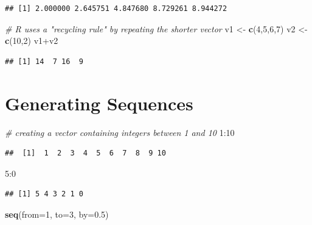 \documentclass[]{book}
\newenvironment{Shaded}{\begin{snugshade}}{\end{snugshade}}
\newcommand{\KeywordTok}[1]{\textcolor[rgb]{0.13,0.29,0.53}{\textbf{{#1}}}}
\newcommand{\DataTypeTok}[1]{\textcolor[rgb]{0.13,0.29,0.53}{{#1}}}
\newcommand{\DecValTok}[1]{\textcolor[rgb]{0.00,0.00,0.81}{{#1}}}
\newcommand{\FloatTok}[1]{\textcolor[rgb]{0.00,0.00,0.81}{{#1}}}
\newcommand{\StringTok}[1]{\textcolor[rgb]{0.31,0.60,0.02}{{#1}}}
\newcommand{\CommentTok}[1]{\textcolor[rgb]{0.56,0.35,0.01}{\textit{{#1}}}}
\newcommand{\NormalTok}[1]{{#1}}
\begin{document}
\begin{verbatim}
## [1] 2.000000 2.645751 4.847680 8.729261 8.944272
\end{verbatim}

\begin{Shaded}
\begin{Highlighting}[]
\CommentTok{# R uses a "recycling rule" by repeating the shorter vector}
\NormalTok{v1 <-}\StringTok{ }\KeywordTok{c}\NormalTok{(}\DecValTok{4}\NormalTok{,}\DecValTok{5}\NormalTok{,}\DecValTok{6}\NormalTok{,}\DecValTok{7}\NormalTok{)}
\NormalTok{v2 <-}\StringTok{ }\KeywordTok{c}\NormalTok{(}\DecValTok{10}\NormalTok{,}\DecValTok{2}\NormalTok{)}
\NormalTok{v1+v2}
\end{Highlighting}
\end{Shaded}

\begin{verbatim}
## [1] 14  7 16  9
\end{verbatim}

\section{Generating Sequences}\label{generating-sequences}

\begin{Shaded}
\begin{Highlighting}[]
\CommentTok{# creating a vector containing integers between 1 and 10}
\DecValTok{1}\NormalTok{:}\DecValTok{10} 
\end{Highlighting}
\end{Shaded}

\begin{verbatim}
##  [1]  1  2  3  4  5  6  7  8  9 10
\end{verbatim}

\begin{Shaded}
\begin{Highlighting}[]
\DecValTok{5}\NormalTok{:}\DecValTok{0}
\end{Highlighting}
\end{Shaded}

\begin{verbatim}
## [1] 5 4 3 2 1 0
\end{verbatim}

\begin{Shaded}
\begin{Highlighting}[]
\KeywordTok{seq}\NormalTok{(}\DataTypeTok{from=}\DecValTok{1}\NormalTok{, }\DataTypeTok{to=}\DecValTok{3}\NormalTok{, }\DataTypeTok{by=}\FloatTok{0.5}\NormalTok{)}
\end{Highlighting}
\end{Shaded}
\end{document}
